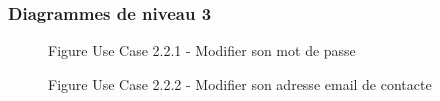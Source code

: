 \documentclass[a4paper, 11pt]{article}
\begin{document}
	\subsubsection{ Diagrammes de niveau 3}
	\begin{figure}[h]
        \caption{Figure Use Case 2.2.1 - Modifier son mot de passe}
        \label{fig-diag-use-case-2-2-1}
        \end{figure}
	\begin{figure}[h]
        \caption{Figure Use Case 2.2.2 - Modifier son adresse email de contacte}
        \label{fig-diag-use-case-2-2-2}
        \end{figure}
\end{document}
